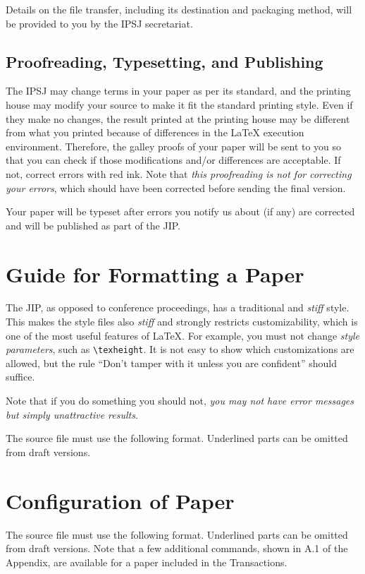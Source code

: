 \documentclass[submit,ses,english]{ipsj-lualatex} %
\begin{document}
Details on the file transfer, including its destination and packaging
method, will be provided to you by the IPSJ secretariat.

\subsection{Proofreading, Typesetting, and Publishing}

The IPSJ may change terms in your paper as per its standard, and the
printing house may modify your source to make it fit the standard
printing style.  Even if they make no changes, the result printed at the
printing house may be different from what you printed because of
differences in the {\LaTeX} execution environment.  Therefore, the
galley proofs of your paper will be sent to you so that you can check if
those modifications and/or differences are acceptable.  If not, correct
errors with red ink.  Note that \textit{this proofreading is not for
correcting your errors}, which should have been corrected before sending
the final version.

Your paper will be typeset after errors you notify us about (if any) are
corrected and will be published as part of the JIP.

\section{Guide for Formatting a Paper}

The JIP, as opposed to conference proceedings, has a traditional and
\textit{stiff} style.  This makes the style files also \textit{stiff}
and strongly restricts customizability, which is one of the most useful
features of {\LaTeX}.  For example, you must not change \textit{style
parameters}, such as \verb+\texheight+.  It is not easy to show which
customizations are allowed, but the rule ``Don't tamper with it unless
you are confident'' should suffice.

Note that if you do something you should not, \textit{you may not have
error messages but simply unattractive results}.

The source file must use the following format.  Underlined parts can be
omitted from draft versions.

\section{Configuration of Paper}
\label{body}

The source file must use the following format.  Underlined parts can be
omitted from draft versions.  Note that a few additional commands, shown
in A.1 of the Appendix, are available for a paper included in the
Transactions.
\end{document}

